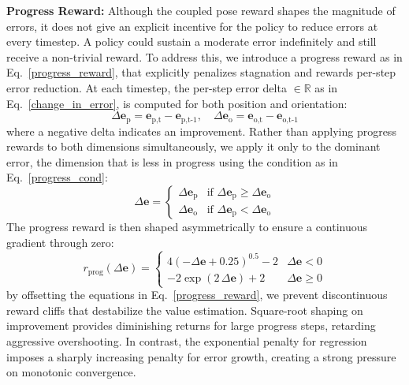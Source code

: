 \documentclass[preprint,12pt]{elsarticle}
\begin{document}
\noindent \textbf{Progress Reward:}
 Although the coupled pose reward shapes the magnitude of errors, it does not give an explicit incentive for the policy to reduce errors at every timestep. A policy could sustain a moderate error indefinitely and still receive a non-trivial reward. To address this, we introduce a progress reward as in Eq.~\ref{progress_reward}, that explicitly penalizes stagnation and rewards per-step error reduction.
 At each timestep, the per-step error delta $\in\mathbb{R}$ as in Eq.~\ref{change_in_error}, is computed for both position and orientation:
 \begin{equation}
    \Delta{\mathbf{\text{e}}}_\text{p} = {\mathbf{\text{e}}}_\text{p,t} - {\mathbf{\text{e}}}_\text{p,t-1}, \quad \Delta{\mathbf{\text{e}}}_\text{o} = {\mathbf{\text{e}}}_\text{o,t} - {\mathbf{\text{e}}}_\text{o,t-1}
    \label{change_in_error}
\end{equation}
where a negative delta indicates an improvement. Rather than applying progress rewards to both dimensions simultaneously, we apply it only to the dominant error, the dimension that is less in progress using the condition as in Eq.~\ref{progress_cond}:
\begin{equation}
    \Delta{\mathbf{\text{e}}} = \begin{cases} \Delta{\mathbf{\text{e}}}_\text{p} & \text{if } \Delta{\mathbf{\text{e}}}_\text{p} \geq \Delta{\mathbf{\text{e}}}_\text{o}\\ 
    \Delta{\mathbf{\text{e}}}_\text{o} & \text{if } \Delta{\mathbf{\text{e}}}_\text{p} < \Delta{\mathbf{\text{e}}}_\text{o}
    \end{cases}
    \label{progress_cond}
\end{equation}
The progress reward is then shaped asymmetrically to ensure a continuous gradient through zero:
\begin{equation}
    r_\text{prog}(\Delta{\mathbf{\text{e}}}) = \begin{cases} 4(-\Delta{\mathbf{\text{e}}} + 0.25)^{0.5} - 2 & \Delta{\mathbf{\text{e}}} < 0 
    \\ -2\exp(2\,\Delta{\mathbf{\text{e}}}) + 2 & \Delta{\mathbf{\text{e}}} \geq 0
    \end{cases}
    \label{progress_reward}
\end{equation}
\noindent by offsetting the equations in Eq.~\ref{progress_reward}, we prevent discontinuous reward cliffs that destabilize the value estimation. Square-root shaping on improvement provides diminishing returns for large progress steps, retarding aggressive overshooting. In contrast, the exponential penalty for regression imposes a sharply increasing penalty for error growth, creating a strong pressure on monotonic convergence.
\end{document}

